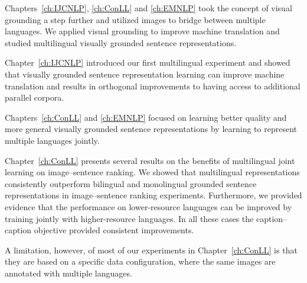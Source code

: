 Chapters~\ref{ch:IJCNLP}, \ref{ch:ConLL} and \ref{ch:EMNLP} took the concept of visual grounding 
a step further and utilized images to bridge between multiple languages. We applied visual grounding 
to improve machine translation and studied multilingual visually grounded sentence representations.

Chapter~\ref{ch:IJCNLP} introduced our first multilingual experiment and showed that visually grounded sentence
representation learning can improve machine translation and  results in orthogonal 
improvements to having access to additional parallel corpora.

Chapters~\ref{ch:ConLL} and \ref{ch:EMNLP} focused on learning better quality and more general 
visually grounded sentence representations by learning to represent multiple languages jointly. 

Chapter~\ref{ch:ConLL} presents several results on the benefits of multilingual joint learning on image--sentence
ranking. 
We showed that
multilingual representations consistently outperform bilingual and monolingual grounded sentence representations
in image--sentence ranking experiments. Furthermore, we provided evidence that the performance on lower-resource 
languages can be improved by training jointly with higher-resource languages. In all these cases the caption--caption
objective provided consistent improvements.		
										
A limitation, however, of most of our experiments in Chapter~\ref{ch:ConLL} is that they are based on a 
specific data configuration, where the same images are annotated with multiple languages.


